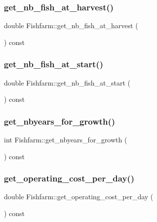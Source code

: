\subsubsection{\texorpdfstring{get\_nb\_fish\_at\_harvest()}{get\_nb\_fish\_at\_harvest()}}
{\footnotesize\ttfamily double Fishfarm\+::get\+\_\+nb\+\_\+fish\+\_\+at\+\_\+harvest (\begin{DoxyParamCaption}{ }\end{DoxyParamCaption}) const}

\mbox{\label{class_fishfarm_a4cbdb503058458f6c78610026d40fff5}} 
\subsubsection{\texorpdfstring{get\_nb\_fish\_at\_start()}{get\_nb\_fish\_at\_start()}}
{\footnotesize\ttfamily double Fishfarm\+::get\+\_\+nb\+\_\+fish\+\_\+at\+\_\+start (\begin{DoxyParamCaption}{ }\end{DoxyParamCaption}) const}

\mbox{\label{class_fishfarm_ab458d0fb8b938d36dab778d045d99138}} 
\subsubsection{\texorpdfstring{get\_nbyears\_for\_growth()}{get\_nbyears\_for\_growth()}}
{\footnotesize\ttfamily int Fishfarm\+::get\+\_\+nbyears\+\_\+for\+\_\+growth (\begin{DoxyParamCaption}{ }\end{DoxyParamCaption}) const}

\mbox{\label{class_fishfarm_a25c20e3fc0a6fe54e46280288cb70682}} 
\subsubsection{\texorpdfstring{get\_operating\_cost\_per\_day()}{get\_operating\_cost\_per\_day()}}
{\footnotesize\ttfamily double Fishfarm\+::get\+\_\+operating\+\_\+cost\+\_\+per\+\_\+day (\begin{DoxyParamCaption}{ }\end{DoxyParamCaption}) const}

